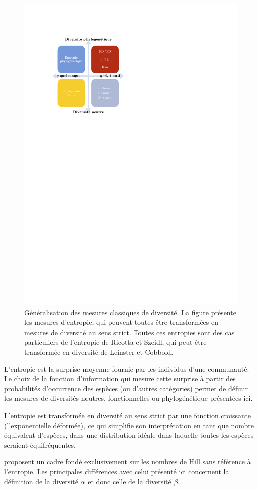 \documentclass[
  11pt,
  french,
  a4paper,
  extrafontsizes,onecolumn,openright
  ]{memoir}
\begin{document}
\begin{figure}

{\centering \includegraphics[width=0.6\linewidth]{images/ConclusionFig} 

}

\caption{Généralisation des mesures classiques de diversité. La figure présente les mesures d'entropie, qui peuvent toutes être transformées en mesures de diversité au sens strict. Toutes ces entropies sont des cas particuliers de l'entropie de Ricotta et Szeidl, qui peut être transformée en diversité de Leinster et Cobbold.}\label{fig:ConclusionFig}
\end{figure}

\normalsize

L'entropie est la surprise moyenne fournie par les individus d'une communauté.
Le choix de la fonction d'information qui mesure cette surprise à partir des probabilités d'occurrence des espèces (ou d'autres catégories) permet de définir les mesures de diversités neutres, fonctionnelles ou phylogénétique présentées ici.

L'entropie est transformée en diversité au sens strict par une fonction croissante (l'exponentielle déformée), ce qui simplifie son interprétation en tant que nombre équivalent d'espèces, dans une distribution idéale dans laquelle toutes les espèces seraient équifréquentes.

\textcite{Chao2014a} proposent un cadre fondé exclusivement sur les nombres de Hill sans référence à l'entropie.
Les principales différences avec celui présenté ici concernent la définition de la diversité \(\alpha\) et donc celle de la diversité \(\beta\).
\end{document}
